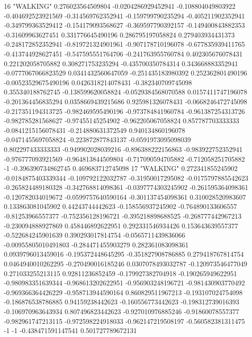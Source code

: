 16 "WALKING" 0.276023564509804 -0.0204286929452941 -0.108804049803922 -0.404692523921569 -0.314569762352941 -0.159799790235294 -0.405211902352941 -0.349799363529412 -0.154179093568627 -0.369597790392157 -0.149400843882353 -0.31609963627451 0.331776645490196 0.286795197058824 0.279403934431373 -0.248172852352941 -0.819721324901961 -0.907178710196078 -0.677835939411765 -0.413744928627451 -0.547595551764706 -0.241763955760784 0.402305676078431 0.221202058705882 0.308271753235294 -0.435700350784314 0.343668883352941 -0.0777067066823529 0.0341432560647059 -0.251435183980392 0.252362801490196 -0.00523529675490196 0.0426318214078431 -0.382340709745098 0.355340188762745 -0.138599620058824 -0.0529384568070588 0.0157411747196078 -0.201364456835294 0.0358669439215686 0.925981326078431 -0.0668246472745098 -0.217351194313725 -0.982469595490196 -0.973784841960784 -0.961387254313726 -0.982785281568627 -0.97455145254902 -0.962205067058824 0.857787703333333 -0.0841215156078431 -0.214880631372549 0.940134860196078 -0.0471455697058824 -0.223872877843137 -0.0591973095098039 0.802297433333333 -0.949902028039216 -0.896388222156863 -0.983922752352941 -0.976777093921569 -0.964813844509804 -0.717090594705882 -0.712058251705882 -1 -0.396390734862745 0.469683712745098
17 "WALKING" 0.272341855245902 -0.0184875403339344 -0.109792122032787 -0.31950017295082 -0.0175797885542623 -0.265824489180328 -0.342768814098361 -0.0397774303245902 -0.261595364098361 -0.120782034019672 -0.0599757640590164 -0.301137454098361 0.310028520983607 0.133863081045902 0.44243744442623 -0.158556937245902 -0.764890133606557 -0.81253966557377 -0.752356128196721 -0.395218898688525 -0.268777442967213 -0.230094888927869 0.458446892622951 0.292331546934426 0.153643639557377 -0.522684245901639 0.390293017814754 -0.0565711439836066 -0.00955805010491803 -0.284471455903279 0.282361083098361 0.0939796013459016 -0.195372448645295 -0.351827908786885 0.279418767814754 0.0464940010262295 -0.270490016185246 0.0307078493032787 -0.120973546477049 0.271033255213115 0.92811236852459 -0.179927382704918 -0.190265949622951 -0.980983351639344 -0.968613202622951 -0.956903248196721 -0.981430903770492 -0.969366364426229 -0.958713944590164 0.860829511967213 -0.193107024754098 -0.186876538786885 0.94159238442623 -0.160556773442623 -0.198312739016393 -0.106970963643934 0.807496823442623 -0.927010976885246 -0.91860078557377 -0.982961747213115 -0.972598224918033 -0.962147219508197 -0.560582381311475 -1 -1 -0.438471591147541 0.501727789672131
